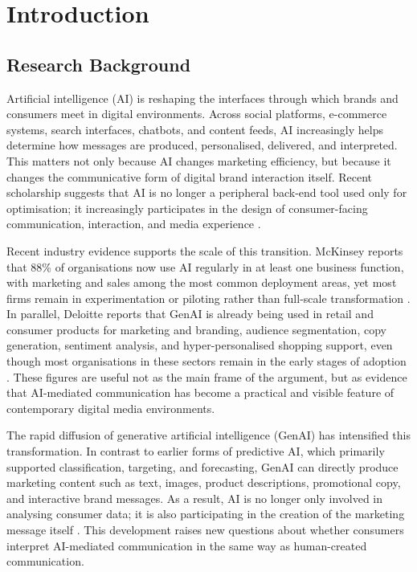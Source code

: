 \chapter{Introduction}

\section{Research Background}
Artificial intelligence (AI) is reshaping the interfaces through which brands and consumers meet in digital environments. Across social platforms, e-commerce systems, search interfaces, chatbots, and content feeds, AI increasingly helps determine how messages are produced, personalised, delivered, and interpreted. This matters not only because AI changes marketing efficiency, but because it changes the communicative form of digital brand interaction itself. Recent scholarship suggests that AI is no longer a peripheral back-end tool used only for optimisation; it increasingly participates in the design of consumer-facing communication, interaction, and media experience \cite{haleem2022ai,kumar2024aipowered,jain2024twodecades}.

Recent industry evidence supports the scale of this transition. McKinsey reports that 88\% of organisations now use AI regularly in at least one business function, with marketing and sales among the most common deployment areas, yet most firms remain in experimentation or piloting rather than full-scale transformation \cite{mckinsey2025stateai}. In parallel, Deloitte reports that GenAI is already being used in retail and consumer products for marketing and branding, audience segmentation, copy generation, sentiment analysis, and hyper-personalised shopping support, even though most organisations in these sectors remain in the early stages of adoption \cite{deloitte2025retailgenai}. These figures are useful not as the main frame of the argument, but as evidence that AI-mediated communication has become a practical and visible feature of contemporary digital media environments.

The rapid diffusion of generative artificial intelligence (GenAI) has intensified this transformation. In contrast to earlier forms of predictive AI, which primarily supported classification, targeting, and forecasting, GenAI can directly produce marketing content such as text, images, product descriptions, promotional copy, and interactive brand messages. As a result, AI is no longer only involved in analysing consumer data; it is also participating in the creation of the marketing message itself \cite{hermann2024consumer,ubal2024framework}. This development raises new questions about whether consumers interpret AI-mediated communication in the same way as human-created communication.

